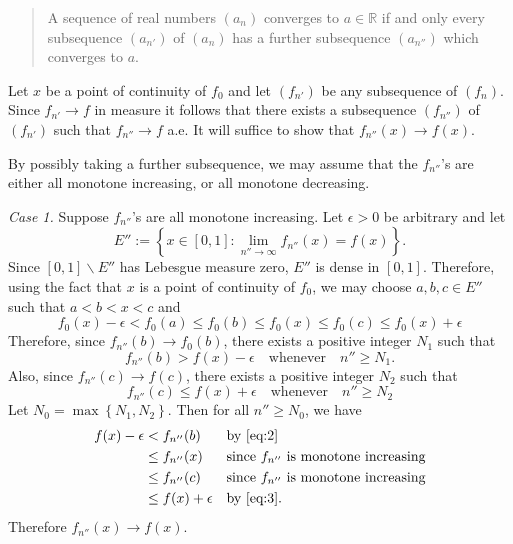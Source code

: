 \documentclass[answers]{exam}
\theoremstyle{problemstyle}
\newcommand{\1}[1]{\textbf{1}_{\left[#1\right]}} %
\begin{document}
\begin{questions}
\begin{solution}
\begin{quote}
  A sequence of real numbers $(a_{n})$ converges
  to $a\in \mathbb{R}$ if and only every subsequence $(a_{n'})$ of $(a_{n})$ has a
  further subsequence $(a_{n''})$ which converges to $a$.
\end{quote}


Let $x$ be a point of continuity of $f_{0}$ and let $(f_{n'})$ be any
subsequence of $(f_{n})$. Since $f_{n'}\to f$ in measure it follows that there
exists a subsequence $(f_{n''})$ of $(f_{n'})$ such that $f_{n''} \to f$ a.e. It
will suffice to show that $f_{n''}(x)\to f(x)$.

By possibly taking a further subsequence, we may assume that the $f_{n''}$'s are
either all monotone increasing, or all monotone decreasing.


\textit{Case 1.} Suppose $f_{n''}$'s are all monotone increasing. Let
$\epsilon>0$ be arbitrary and let
\begin{equation*}
  E'' := \left\{x\in [0,1] :\lim_{n''\to\infty} f_{n''}(x) = f(x) \right\}.
\end{equation*}
Since $[0,1]\backslash E''$ has Lebesgue measure zero, $E''$ is dense in
$[0,1]$. Therefore, using the fact that $x$ is a point of continuity of $f_{0}$,
we may choose $a,b,c\in E''$ such that $a<b<x<c$ and
\begin{equation}
  \label{eq:1}
  f_{0}(x)-\epsilon
  < f_{0}(a)
  \leq f_{0}(b)
  \leq f_{0}(x)
  \leq f_{0}(c)
  \leq f_{0}(x) + \epsilon
\end{equation}
Therefore, since $f_{n''}(b)\to f_{0}(b)$, there exists a positive integer
$N_{1}$ such that
\begin{equation}
  \label{eq:2}
  f_{n''}(b)> f(x)-\epsilon \quad \text{whenever} \quad n'' \geq N_{1}.
\end{equation}
Also, since $f_{n''}(c)\to f(c)$, there exists a positive integer $N_{2}$ such
that
\begin{equation}
  \label{eq:3}
  f_{n''}(c) \leq  f(x)+ \epsilon \quad \text{whenever} \quad n'' \geq N_{2}
\end{equation}
Let $N_{0}= \max \left\{N_{1},N_{2}\right\}$. Then for all $n'' \geq N_{0}$,  we
have
\begin{align*}
  f(x)-\epsilon
  &< f_{n''}(b)
    &&\text{by \eqref{eq:2}}\\
  &\leq f_{n''}(x)
    &&\text{since $f_{n''}$ is monotone increasing}\\
  &\leq f_{n''}(c)
    &&\text{since $f_{n''}$ is monotone increasing}\\
  &\leq f(x)+\epsilon
    &&\text{by \eqref{eq:3}}.
\end{align*}
Therefore $f_{n''}(x)\to f(x)$.


\end{solution}
\end{questions}
\end{document}
